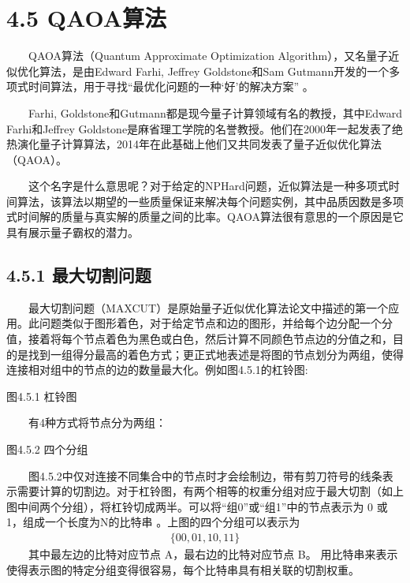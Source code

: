 \documentclass[a4paper,11pt,english]{sphinxmanual}
\let\sphinxpxdimen\pdfpxdimen\else\newdimen\sphinxpxdimen
\begin{document}
\sphinxstepscope


\section{4.5 QAOA算法}
\label{\detokenize{rst/4.5QAOA_u7b97_u6cd5:qaoa}}\label{\detokenize{rst/4.5QAOA_u7b97_u6cd5::doc}}
\sphinxAtStartPar
  QAOA算法（Quantum Approximate Optimization Algorithm），又名量子近似优化算法，是由Edward Farhi, Jeffrey Goldstone和Sam Gutmann开发的一个多项式时间算法，用于寻找“最优化问题的一种‘好’的解决方案” 。

\sphinxAtStartPar
  Farhi, Goldstone和Gutmann都是现今量子计算领域有名的教授，其中Edward Farhi和Jeffrey Goldstone是麻省理工学院的名誉教授。他们在2000年一起发表了绝热演化量子计算算法，2014年在此基础上他们又共同发表了量子近似优化算法（QAOA）。

\sphinxAtStartPar
  这个名字是什么意思呢？对于给定的NP\sphinxhyphen{}Hard问题，近似算法是一种多项式时间算法，该算法以期望的一些质量保证来解决每个问题实例，其中品质因数是多项式时间解的质量与真实解的质量之间的比率。QAOA算法很有意思的一个原因是它具有展示量子霸权的潜力。


\subsection{4.5.1 最大切割问题}
\label{\detokenize{rst/4.5QAOA_u7b97_u6cd5:id1}}
\sphinxAtStartPar
  最大切割问题（MAXCUT）是原始量子近似优化算法论文中描述的第一个应用。此问题类似于图形着色，对于给定节点和边的图形，并给每个边分配一个分值，接着将每个节点着色为黑色或白色，然后计算不同颜色节点边的分值之和，目的是找到一组得分最高的着色方式；更正式地表述是将图的节点划分为两组，使得连接相对组中的节点的边的数量最大化。例如图4.5.1的杠铃图:

\noindent{\hspace*{\fill}\sphinxincludegraphics[width=350\sphinxpxdimen]{{4.5.1}.png}\hspace*{\fill}}

\begin{center}图4.5.1 杠铃图
\end{center}
\sphinxAtStartPar
  有4种方式将节点分为两组：


\begin{center}图4.5.2 四个分组
\end{center}
\sphinxAtStartPar
  图4.5.2中仅对连接不同集合中的节点时才会绘制边，带有剪刀符号的线条表示需要计算的切割边。对于杠铃图，有两个相等的权重分组对应于最大切割（如上图中间两个分组），将杠铃切成两半。可以将“组0”或“组1”中的节点表示为 0 或 1，组成一个长度为N的比特串 。上图的四个分组可以表示为
\begin{equation*}
\begin{split}\{00,01,10,11\}\end{split}
\end{equation*}
\sphinxAtStartPar
  其中最左边的比特对应节点 A，最右边的比特对应节点 B。 用比特串来表示使得表示图的特定分组变得很容易，每个比特串具有相关联的切割权重。
\end{document}

